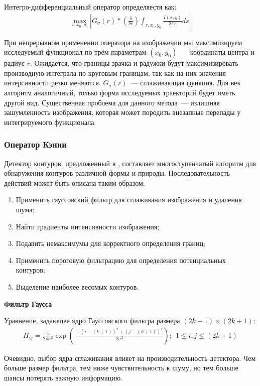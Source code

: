 \documentclass[12pt]{article} %
\begin{document}
Интегро-дифференциальный оператор определяестя как:
\begin{gather}\label{ido}
	\max_{r, x_0, y_0}{\left| G_\sigma(r)*\left(\frac{\delta}{\delta r}\right)\int_{r, x_0, y_0}{\frac{I(x,y)}{2\pi r}ds}\right|}
\end{gather}

При непрерывном применении оператора на изображении мы максимизируем исследуемый функционал по трём параметрам $(x_0, y_0)$~--- координаты центра и радиус $r$. Ожидается, что границы зрачка и радужки будут максимизировать производную интеграла по круговым границам, так как на них значения интерсивности резко меняются. $G_\sigma(r)$~--- сглаживающая функция. Для век алгоритм аналогичный, только форма исследуемых траекторий будет иметь другой вид. Существенная проблема для данного метода~--- излишняя зашумленность изображения, которая может породить внезапные перепады у интегрируемого функционала.


\subsubsection{Оператор Кэнни}

Детектор контуров, предложенный в \cite{Canny}, составляет многоступенчатый алгоритм для обнаружения контуров различной формы и природы. Последовательность действий может быть описана таким образом:

\begin{enumerate}
	\item Применить гауссовский фильтр для сглаживания изображения и удаления шума;
	\item Найти градиенты интенсивности изображения;
	\item Подавить немаксимумы для корректного определения границ;
	\item Применить пороговую фильтрацию для определения потенциальных контуров;
	\item Выделение наиболее весомых контуров.
\end{enumerate}

\textbf{Фильтр Гаусса}

Уравнение, задающее ядро Гауссовского фильтра размера $(2k+1)\times (2k+1)$:
\begin{gather}\label{norm}
	H_{ij}=\frac{1}{2\pi \sigma^2}\exp{\left(\ \frac {-(i-(k+1))^2+(j-(k+1))^2}{2\sigma^2}\right)};~~1\leq i, j \leq(2k+1)
\end{gather}

Очевидно, выбор ядра сглаживания влияет на производительность детектора. Чем больше размер фильтра, тем ниже чувствительность к шуму, но тем больше шансы потерять важную информацию.
\end{document}
